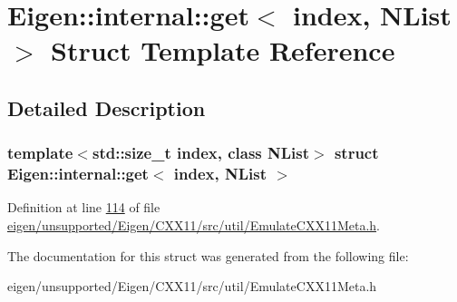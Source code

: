 \hypertarget{struct_eigen_1_1internal_1_1get}{}\section{Eigen\+:\+:internal\+:\+:get$<$ index, N\+List $>$ Struct Template Reference}
\label{struct_eigen_1_1internal_1_1get}


\subsection{Detailed Description}
\subsubsection*{template$<$std\+::size\+\_\+t index, class N\+List$>$\newline
struct Eigen\+::internal\+::get$<$ index, N\+List $>$}



Definition at line \hyperlink{eigen_2unsupported_2_eigen_2_c_x_x11_2src_2util_2_emulate_c_x_x11_meta_8h_source_l00114}{114} of file \hyperlink{eigen_2unsupported_2_eigen_2_c_x_x11_2src_2util_2_emulate_c_x_x11_meta_8h_source}{eigen/unsupported/\+Eigen/\+C\+X\+X11/src/util/\+Emulate\+C\+X\+X11\+Meta.\+h}.



The documentation for this struct was generated from the following file\+:\begin{DoxyCompactItemize}
\item 
eigen/unsupported/\+Eigen/\+C\+X\+X11/src/util/\+Emulate\+C\+X\+X11\+Meta.\+h\end{DoxyCompactItemize}

